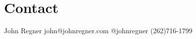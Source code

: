 
\section{Contact}

John Regner\newline
john{@}johnregner.com\newline
{@}john\textunderscore{}regner\newline
(262)716-1799\newline



